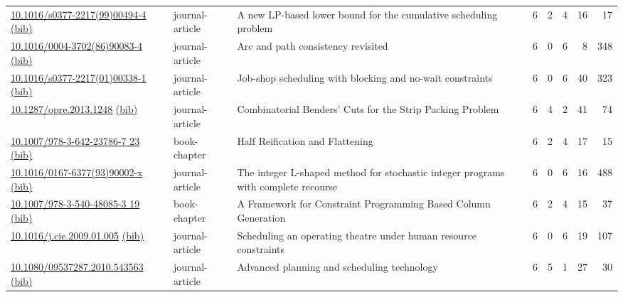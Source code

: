 {\begin{longtable}{p{5cm}lp{11cm}rrrrr}
\href{http://dx.doi.org/10.1016/s0377-2217(99)00494-4}{10.1016/s0377-2217(99)00494-4} \href{https://www.doi2bib.org/bib/10.1016/s0377-2217(99)00494-4}{(bib)} & journal-article & A new LP-based lower bound for the cumulative scheduling problem & 6 & 2 & 4 & 16 & 17 \\
\href{http://dx.doi.org/10.1016/0004-3702(86)90083-4}{10.1016/0004-3702(86)90083-4} \href{https://www.doi2bib.org/bib/10.1016/0004-3702(86)90083-4}{(bib)} & journal-article & Arc and path consistency revisited & 6 & 0 & 6 & 8 & 348 \\
\href{http://dx.doi.org/10.1016/s0377-2217(01)00338-1}{10.1016/s0377-2217(01)00338-1} \href{https://www.doi2bib.org/bib/10.1016/s0377-2217(01)00338-1}{(bib)} & journal-article & Job-shop scheduling with blocking and no-wait constraints & 6 & 0 & 6 & 40 & 323 \\
\href{http://dx.doi.org/10.1287/opre.2013.1248}{10.1287/opre.2013.1248} \href{https://www.doi2bib.org/bib/10.1287/opre.2013.1248}{(bib)} & journal-article & Combinatorial Benders' Cuts for the Strip Packing Problem & 6 & 4 & 2 & 41 & 74 \\
\href{http://dx.doi.org/10.1007/978-3-642-23786-7_23}{10.1007/978-3-642-23786-7 23} \href{https://www.doi2bib.org/bib/10.1007/978-3-642-23786-7_23}{(bib)} & book-chapter & Half Reification and Flattening & 6 & 2 & 4 & 17 & 15 \\
\href{http://dx.doi.org/10.1016/0167-6377(93)90002-x}{10.1016/0167-6377(93)90002-x} \href{https://www.doi2bib.org/bib/10.1016/0167-6377(93)90002-x}{(bib)} & journal-article & The integer L-shaped method for stochastic integer programs with complete recourse & 6 & 0 & 6 & 16 & 488 \\
\href{http://dx.doi.org/10.1007/978-3-540-48085-3_19}{10.1007/978-3-540-48085-3 19} \href{https://www.doi2bib.org/bib/10.1007/978-3-540-48085-3_19}{(bib)} & book-chapter & A Framework for Constraint Programming Based Column Generation & 6 & 2 & 4 & 15 & 37 \\
\href{http://dx.doi.org/10.1016/j.cie.2009.01.005}{10.1016/j.cie.2009.01.005} \href{https://www.doi2bib.org/bib/10.1016/j.cie.2009.01.005}{(bib)} & journal-article & Scheduling an operating theatre under human resource constraints & 6 & 0 & 6 & 19 & 107 \\
\href{http://dx.doi.org/10.1080/09537287.2010.543563}{10.1080/09537287.2010.543563} \href{https://www.doi2bib.org/bib/10.1080/09537287.2010.543563}{(bib)} & journal-article & Advanced planning and scheduling technology & 6 & 5 & 1 & 27 & 30 \\

\end{longtable}}
